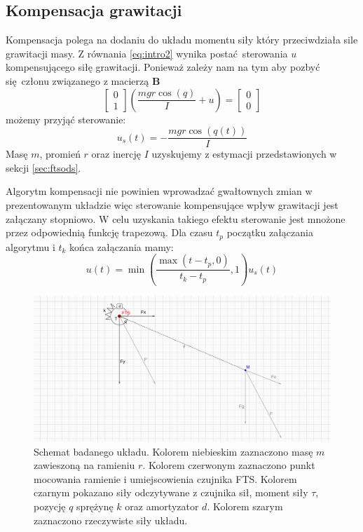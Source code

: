 \documentclass[12pt,a4paper]{article}
\begin{document}
	\subsection{Kompensacja grawitacji}
	Kompensacja polega na dodaniu do układu momentu siły który przeciwdziała sile grawitacji masy. Z równania \ref{eq:intro2} wynika postać sterowania $u$ kompensującego siłę grawitacji. Ponieważ zależy nam na tym aby pozbyć się członu związanego z macierzą $\mathbf{B}$
	\begin{equation}
	\begin{bmatrix}
	0 \\
	1
	\end{bmatrix}
	(\frac{mgr\cos{(q)}}{I} + u) = 	\begin{bmatrix}
	0 \\
	0
	\end{bmatrix}
	\end{equation}
	możemy przyjąć sterowanie:
	\begin{equation}
	u_s(t) = -\frac{mgr\cos{(q(t))}}{I}
	\end{equation}
	Masę $m$, promień $r$ oraz inercję $I$ uzyskujemy z estymacji przedstawionych w sekcji \ref{sec:ftsods}.
	
	
	Algorytm kompensacji nie powinien wprowadzać gwałtownych zmian w prezentowanym układzie więc sterowanie kompensujące wpływ grawitacji jest załączany stopniowo. W celu uzyskania takiego efektu sterowanie jest mnożone przez odpowiednią funkcję trapezową. Dla czasu $t_p$ początku załączania algorytmu i $t_k$ końca załączania mamy:
	\begin{equation}
	u(t) = \min{(\frac{\max{( t - t_p, 0)}}{t_k-t_p}, 1)}u_s(t)
	\end{equation}
	
	
	
	\begin{figure}[H]
		\includegraphics[width=0.99\linewidth]{2d}
		\centering
		\caption{Schemat badanego układu. Kolorem niebieskim zaznaczono masę $m$ zawieszoną na ramieniu $r$. Kolorem czerwonym zaznaczono punkt mocowania ramienie i umiejscowienia czujnika FTS. Kolorem czarnym pokazano siły odczytywane z czujnika sił, moment siły $\tau$, pozycję $q$ sprężynę $k$ oraz amortyzator $d$. Kolorem szarym zaznaczono rzeczywiste siły układu.}
		\label{fig:2d}
	\end{figure}
	
\end{document}
